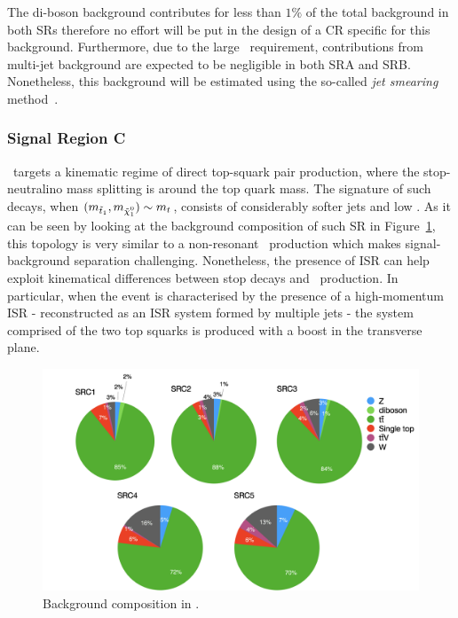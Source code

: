 				The di-boson background contributes for less than $1\%$ of the total background in both \acp{SR} therefore no effort will be put in the design of a \ac{CR} specific for this background. Furthermore, due to the large \met\ requirement, contributions from multi-jet background are expected to be negligible in both SRA and SRB. Nonetheless, this background will be estimated using the so-called \emph{jet smearing} method~\cite{calumThesis}.




			\subsubsection*{Signal Region C}

				\SRC\ targets a kinematic regime of direct top-squark pair production, where the stop-neutralino mass splitting is around the top quark mass. The signature of such decays, when $(\mstopone, \mninoone) \sim m_t$, consists of considerably softer jets and low \met. As it can be seen by looking at the background composition of such \ac{SR} in Figure~\ref{fig:SRC_bkgcomp}, this topology is very similar to a non-resonant \ttbar\ production which makes signal-background separation challenging. Nonetheless, the presence of \ac{ISR} can help exploit kinematical differences between stop decays and \ttbar\ production. In particular, when the event is characterised by the presence of a high-momentum \ac{ISR} - reconstructed as an \ac{ISR} system formed by multiple jets - the system comprised of the two top squarks is produced with a boost in the transverse plane.

				\begin{figure}[t]
				  \begin{center}
				   \includegraphics[width=\textwidth]{figures/stop/piechart_SRCcomp}
				   \caption{Background composition in \SRC.}
				   \label{fig:SRC_bkgcomp}
				  \end{center}
				\end{figure}

